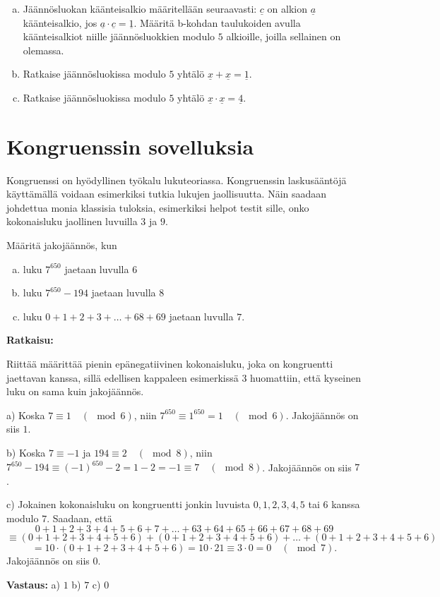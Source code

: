 \begin{enumerate}
\begin{enumerate}[a)]
\item Jäännösluokan käänteisalkio määritellään seuraavasti: $\underline{c}$ on alkion $\underline{a}$ käänteisalkio, jos $\underline{a} \cdot \underline{c} = \underline{1}$. Määritä b-kohdan taulukoiden avulla käänteisalkiot niille jäännösluokkien modulo $5$ alkioille, joilla sellainen on olemassa.
\item Ratkaise jäännösluokissa modulo $5$ yhtälö $\underline{x}+\underline{x}=\underline{1}$.
\item Ratkaise jäännösluokissa modulo $5$ yhtälö $\underline{x}\cdot \underline{x}=\underline{4}$.
\end{enumerate}

\end{enumerate}

\newpage

\section{Kongruenssin sovelluksia}
Kongruenssi on hyödyllinen työkalu lukuteoriassa. Kongruenssin laskusääntöjä käyttämällä voidaan esimerkiksi tutkia lukujen jaollisuutta. Näin saadaan johdettua monia klassisia tuloksia, esimerkiksi helpot testit sille, onko kokonaisluku jaollinen luvuilla $3$ ja $9$.

\begin{esimerkki}
Määritä jakojäännös, kun
\begin{enumerate}[a)]
\item luku $7^{650}$ jaetaan luvulla $6$
\item luku $7^{650} - 194$ jaetaan luvulla $8$
\item luku $0+1+2+3+ \ldots + 68 + 69$ jaetaan luvulla $7$.
\end{enumerate}

{\bf Ratkaisu:}

Riittää määrittää pienin epänegatiivinen kokonaisluku, joka on kongruentti jaettavan kanssa, sillä edellisen kappaleen esimerkissä 3 huomattiin, että kyseinen luku on sama kuin jakojäännös.

a) Koska $7 \equiv 1 \quad(\mod 6)$, niin $7^{650} \equiv 1^{650} = 1 \quad (\mod 6)$. Jakojäännös on siis $1$.

b) Koska $7 \equiv -1$ ja $194 \equiv 2 \quad(\mod 8)$, niin $7^{650} - 194 \equiv (-1)^{650} - 2 = 1 - 2 = -1 \equiv 7 \quad(\mod 8)$. Jakojäännös on siis $7$.

c) Jokainen kokonaisluku on kongruentti jonkin luvuista $0,1,2,3,4,5$ tai $6$ kanssa modulo $7$. Saadaan, että
\[
0+1+2+3+4+5+6+7+ \ldots +63+64+65+66+67+68+69
\]
\[
 \equiv (0+1+2+3+4+5+6)+(0+1+2+3+4+5+6)+ \ldots +(0+1+2+3+4+5+6)
\]
\[
=10 \cdot (0+1+2+3+4+5+6) = 10\cdot 21 \equiv 3\cdot 0 = 0 \quad(\mod 7).
\]
Jakojäännös on siis $0$.

{\bf Vastaus:} a) $1$ b) $7$ c) $0$
\end{esimerkki}

